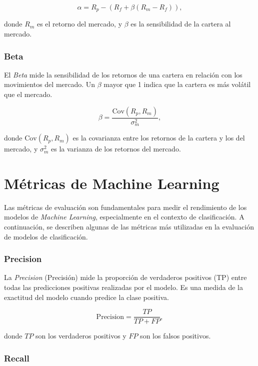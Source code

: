 \documentclass[a4paper,12pt, twoside]{report}
\begin{document}
\begin{equation}
\alpha = R_p - \left(R_f + \beta (R_m - R_f)\right),
\end{equation}

donde $R_m$ es el retorno del mercado, y $\beta$ es la sensibilidad de la cartera al mercado.

\subsubsection{Beta}

El \textit{Beta} mide la sensibilidad de los retornos de una cartera en relación con los movimientos del mercado. Un $\beta$ mayor que 1 indica que la cartera es más volátil que el mercado.

\begin{equation}
\beta = \frac{\text{Cov}(R_p, R_m)}{\sigma^2_m},
\end{equation}

donde $\text{Cov}(R_p, R_m)$ es la covarianza entre los retornos de la cartera y los del mercado, y $\sigma^2_m$ es la varianza de los retornos del mercado.

\section{Métricas de Machine Learning}

Las métricas de evaluación son fundamentales para medir el rendimiento de los modelos de \textit{Machine Learning}, especialmente en el contexto de clasificación. A continuación, se describen algunas de las métricas más utilizadas en la evaluación de modelos de clasificación.

\subsubsection{Precision}

La \textit{Precision} (Precisión) mide la proporción de verdaderos positivos (TP) entre todas las predicciones positivas realizadas por el modelo. Es una medida de la exactitud del modelo cuando predice la clase positiva.

\begin{equation}
\text{Precision} = \frac{TP}{TP + FP},
\end{equation}

donde $TP$ son los verdaderos positivos y $FP$ son los falsos positivos.

\subsubsection{Recall}
\end{document}

